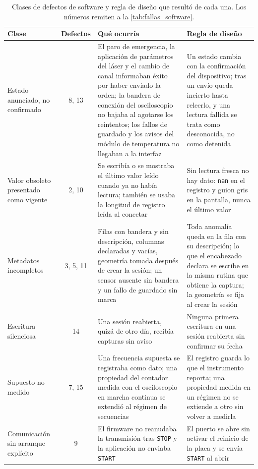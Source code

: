 \begin{table}[H]
  \centering
  \caption{Clases de defectos de software y regla de diseño que resultó
           de cada una. Los números remiten a la
           \cref{tab:fallas_software}.}
  \label{tab:clases_defectos}
  \footnotesize
  \begin{tabular}{>{\raggedright\arraybackslash}p{2.8cm}c>{\raggedright\arraybackslash}p{5.0cm}>{\raggedright\arraybackslash}p{4.4cm}}
    \toprule
    \textbf{Clase} & \textbf{Defectos} & \textbf{Qué ocurría} &
    \textbf{Regla de diseño} \\
    \midrule
    Estado anunciado, no confirmado & 8, 13 &
    El paro de emergencia, la aplicación de parámetros del láser y el
    cambio de canal informaban éxito por haber enviado la orden; la
    bandera de conexión del osciloscopio no bajaba al agotarse los
    reintentos; los fallos de guardado y los avisos del módulo de
    temperatura no llegaban a la interfaz &
    Un estado cambia con la confirmación del dispositivo; tras un
    envío queda incierto hasta releerlo, y una lectura fallida se
    trata como desconocida, no como detenida \\
    \addlinespace[2pt]
    Valor obsoleto presentado como vigente & 2, 10 &
    Se escribía o se mostraba el último valor leído cuando ya no había
    lectura; también se usaba la longitud de registro leída al conectar &
    Sin lectura fresca no hay dato: \texttt{nan} en el registro y guion
    gris en la pantalla, nunca el último valor \\
    \addlinespace[2pt]
    Metadatos incompletos & 3, 5, 11 &
    Filas con bandera y sin descripción, columnas declaradas y vacías,
    geometría tomada después de crear la sesión; un sensor ausente sin
    bandera y un fallo de guardado sin marca &
    Toda anomalía queda en la fila con su descripción; lo que el
    encabezado declara se escribe en la misma rutina que obtiene la
    captura; la geometría se fija al crear la sesión \\
    \addlinespace[2pt]
    Escritura silenciosa & 14 &
    Una sesión reabierta, quizá de otro día, recibía capturas sin aviso &
    Ninguna primera escritura en una sesión reabierta sin confirmar su
    fecha \\
    \addlinespace[2pt]
    Supuesto no medido & 7, 15 &
    Una frecuencia supuesta se registraba como dato; una propiedad del
    contador medida con el osciloscopio en marcha continua se extendió
    al régimen de secuencias &
    El registro guarda lo que el instrumento reporta; una propiedad
    medida en un régimen no se extiende a otro sin volver a medirla \\
    \addlinespace[2pt]
    Comunicación sin arranque explícito & 9 &
    El firmware no reanudaba la transmisión tras \texttt{STOP} y la
    aplicación no enviaba \texttt{START} &
    El puerto se abre sin activar el reinicio de la placa y se envía
    \texttt{START} al abrir \\
    \bottomrule
  \end{tabular}
\end{table}

